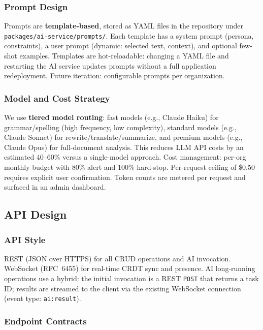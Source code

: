\documentclass[10pt, a4paper]{article}
\begin{document}
\subsubsection{Prompt Design}
Prompts are \textbf{template-based}, stored as YAML files in the repository under \texttt{packages/ai-service/prompts/}. Each template has a system prompt (persona, constraints), a user prompt (dynamic: selected text, context), and optional few-shot examples. Templates are hot-reloadable: changing a YAML file and restarting the AI service updates prompts without a full application redeployment. Future iteration: configurable prompts per organization.

\subsubsection{Model and Cost Strategy}
We use \textbf{tiered model routing}: fast models (e.g., Claude Haiku) for grammar/spelling (high frequency, low complexity), standard models (e.g., Claude Sonnet) for rewrite/translate/summarize, and premium models (e.g., Claude Opus) for full-document analysis. This reduces LLM API costs by an estimated 40--60\% versus a single-model approach. Cost management: per-org monthly budget with 80\% alert and 100\% hard-stop. Per-request ceiling of \$0.50 requires explicit user confirmation. Token counts are metered per request and surfaced in an admin dashboard.


\subsection{API Design}

\subsubsection{API Style}
REST (JSON over HTTPS) for all CRUD operations and AI invocation. WebSocket (RFC~6455) for real-time CRDT sync and presence. AI long-running operations use a hybrid: the initial invocation is a REST \texttt{POST} that returns a task ID; results are streamed to the client via the existing WebSocket connection (event type: \texttt{ai:result}).

\subsubsection{Endpoint Contracts}
\end{document}
